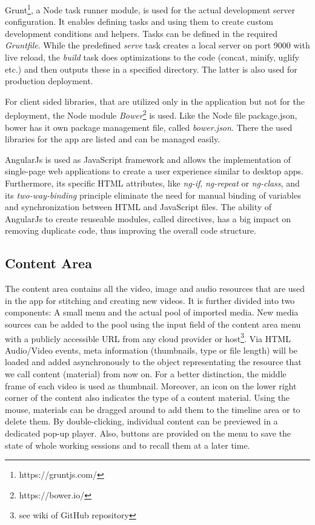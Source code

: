 \documentclass[conference]{IEEEtran}
\begin{document}
Grunt\footnote{https://gruntjs.com/}, a Node task runner module, is used for the actual development server configuration.
It enables defining tasks and using them to create custom development conditions and helpers.
Tasks can be defined in the required \textit{Gruntfile}.
While the predefined \textit{serve} task creates a local server on port 9000 with live reload, the \textit{build} task does optimizations to the code (concat, minify, uglify etc.) and then outputs these in a specified directory.
The latter is also used for production deployment.

For client sided libraries, that are utilized only in the application but not for the deployment, the Node module \textit{Bower}\footnote{https://bower.io/} is used.
Like the Node file package.json, bower has it own package management file, called \textit{bower.json}.
There the used libraries for the app are listed and can be managed easily.

AngularJs is used as JavaScript framework and allows the implementation of single-page web applications to create a user experience similar to desktop apps.
Furthermore, its specific HTML attributes, like \textit{ng-if}, \textit{ng-repeat} or \textit{ng-class}, and its \textit{two-way-binding} principle eliminate the need for manual binding of variables and synchronization between HTML and JavaScript files.
The ability of AngularJs to create reuseable modules, called directives, has a big impact on removing duplicate code, thus improving the overall code structure.

\subsection{Content Area}
The content area contains all the video, image and audio resources that are used in the app for stitching and creating new videos.
It is further divided into two components: A small menu and the actual pool of imported media.
New media sources can be added to the pool using the input field of the content area menu with a publicly accessible URL from any cloud provider or host\footnote{see wiki of GitHub repository}.
Via HTML Audio/Video events, meta information (thumbnails, type or file length) will be loaded and added asynchronously to the object representating the resource that we call content (material) from now on.
For a better distinction, the middle frame of each video is used as thumbnail.
Moreover, an icon on the lower right corner of the content also indicates the type of a content material.
Using the mouse, materials can be dragged around to add them to the timeline area or to delete them.
By double-clicking, individual content can be previewed in a dedicated pop-up player.
Also, buttons are provided on the menu to save the state of whole working sessions and to recall them at a later time.
\end{document}
